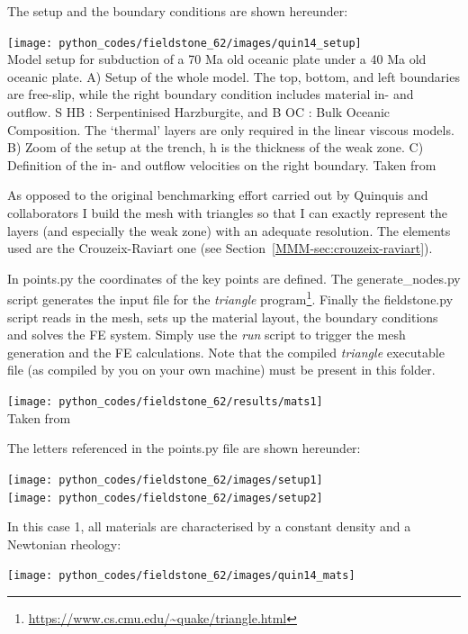 The setup and the boundary conditions are shown hereunder:
\begin{center}
\texttt{[image: python\_codes/fieldstone\_62/images/quin14\_setup]}\\
{\captionfont Model setup for subduction of a 70 Ma old oceanic plate under a 40 Ma
old oceanic plate. A) Setup of the whole model. The top, bottom, and left boundaries
are free-slip, while the right boundary condition includes material in- and outflow. S HB :
Serpentinised Harzburgite, and B OC : Bulk Oceanic Composition. The ‘thermal’ layers
are only required in the linear viscous models. B) Zoom of the setup at the trench, h is the
thickness of the weak zone. C) Definition of the in- and outflow velocities on the right
boundary. Taken from \cite{quin14}}
\end{center}

As opposed to the original benchmarking effort carried out by Quinquis and collaborators
I build the mesh with triangles so that I can exactly represent the layers (and especially 
the weak zone) with an adequate resolution. The elements used are the Crouzeix-Raviart one
(see Section~\ref{MMM-sec:crouzeix-raviart}). 

In {points.py} the coordinates of the key points are defined. The {generate\_nodes.py}
script generates the input file for 
the {\sl triangle} program\footnote{\url{https://www.cs.cmu.edu/~quake/triangle.html}}. 
Finally the {fieldstone.py} script 
reads in the mesh, sets up the material layout, the boundary conditions and solves the 
FE system. Simply use the {\sl run} script to trigger the mesh generation and the FE 
calculations.  
Note that the compiled {\sl triangle} executable file (as compiled by you 
on your own machine) must be present in this folder.

\begin{center}
\texttt{[image: python\_codes/fieldstone\_62/results/mats1]}\\
{\captionfont Taken from \cite{quin14}}
\end{center}

The letters referenced in the {points.py} file are shown hereunder:

\begin{center}
\texttt{[image: python\_codes/fieldstone\_62/images/setup1]}\\
\texttt{[image: python\_codes/fieldstone\_62/images/setup2]}
\end{center}


In this case 1, all materials are characterised by a constant density and a Newtonian rheology:
\begin{center}
\texttt{[image: python\_codes/fieldstone\_62/images/quin14\_mats]}
\end{center}

